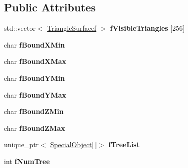 \subsection*{\-Public \-Attributes}
\begin{DoxyCompactItemize}
\item 
\hypertarget{classChunkObject_a2c0bf18b0723a9e20fe631d7e099e3dd}{std\-::vector$<$ \hyperlink{structTriangleSurfacef}{\-Triangle\-Surfacef} $>$ {\bfseries f\-Visible\-Triangles} \mbox{[}256\mbox{]}}\label{classChunkObject_a2c0bf18b0723a9e20fe631d7e099e3dd}

\item 
\hypertarget{classChunkObject_af351f75b98f8e66865285b0999846f42}{char {\bfseries f\-Bound\-X\-Min}}\label{classChunkObject_af351f75b98f8e66865285b0999846f42}

\item 
\hypertarget{classChunkObject_aeb4a714995d2e47a8b6f956302fbbb04}{char {\bfseries f\-Bound\-X\-Max}}\label{classChunkObject_aeb4a714995d2e47a8b6f956302fbbb04}

\item 
\hypertarget{classChunkObject_adf1f1536c49de477f583b4032419fa3d}{char {\bfseries f\-Bound\-Y\-Min}}\label{classChunkObject_adf1f1536c49de477f583b4032419fa3d}

\item 
\hypertarget{classChunkObject_aa58560b8a005b223a15dfe03799f55c8}{char {\bfseries f\-Bound\-Y\-Max}}\label{classChunkObject_aa58560b8a005b223a15dfe03799f55c8}

\item 
\hypertarget{classChunkObject_ac659b3d9058cda60b9ec2accfac58623}{char {\bfseries f\-Bound\-Z\-Min}}\label{classChunkObject_ac659b3d9058cda60b9ec2accfac58623}

\item 
\hypertarget{classChunkObject_a2716b8931b56f5ef33a27e3250d39cfa}{char {\bfseries f\-Bound\-Z\-Max}}\label{classChunkObject_a2716b8931b56f5ef33a27e3250d39cfa}

\item 
\hypertarget{classChunkObject_a0b8cedbb86c56b0c7cb5033a4336b687}{unique\-\_\-ptr$<$ \hyperlink{structChunkObject_1_1SpecialObject}{\-Special\-Object}\mbox{[}$\,$\mbox{]}$>$ {\bfseries f\-Tree\-List}}\label{classChunkObject_a0b8cedbb86c56b0c7cb5033a4336b687}

\item 
\hypertarget{classChunkObject_a54aaa4d000bafe8d0c71eef55832866e}{int {\bfseries f\-Num\-Tree}}\label{classChunkObject_a54aaa4d000bafe8d0c71eef55832866e}


\end{DoxyCompactItemize}
